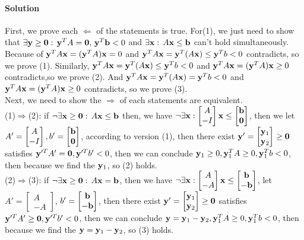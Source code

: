 \documentclass[12pt,a4]{article}
\begin{document}
\paragraph{Solution}
First, we prove each $\Longleftarrow$ of the statements is true. For(1), we just need to show that $ \exists \mathbf{y} \geq \mathbf{0} : \, \mathbf{y}^T A = \mathbf{0}, \,     \mathbf{y}^T \mathbf{b} < 0$ and $\exists \mathbf{x} : \, A \mathbf{x} \leq \mathbf{b}$ can't hold simultaneously. Because of $\mathbf{y}^T A \mathbf{x} = (\mathbf{y}^T A) \mathbf{x} = 0$ and $\mathbf{y}^T A \mathbf{x} = \mathbf{y}^T (A \mathbf{x}) \leq \mathbf{y}^T b < 0$ contradicts, so we prove (1). Similarly, $\mathbf{y}^T A \mathbf{x} = \mathbf{y}^T (A \mathbf{x}) \leq \mathbf{y}^T b < 0$ and $\mathbf{y}^T A \mathbf{x} = (\mathbf{y}^T A) \mathbf{x} \geq 0$ contradicts,so we prove (2). And $\mathbf{y}^T A \mathbf{x} = \mathbf{y}^T (A \mathbf{x}) = \mathbf{y}^T b < 0$ and $\mathbf{y}^T A \mathbf{x} = (\mathbf{y}^T A) \mathbf{x} \geq 0$ contradicts, so we prove (3).\\
Next, we need to show the $\Longrightarrow$ of each statements are equivalent.\\
(1)$\Longrightarrow$(2): if $\neg \exists \mathbf{x} \geq \mathbf{0} : \, A \mathbf{x} \leq \mathbf{b}$ then, we have $\neg \exists \mathbf{x} : \begin{bmatrix} A \\ -I \end{bmatrix} \mathbf{x} \leq \begin{bmatrix} \mathbf{b} \\ \mathbf{0} \end{bmatrix} $, then we let $A' = \begin{bmatrix} A \\ -I \end{bmatrix}, b' = \begin{bmatrix} \mathbf{b} \\ \mathbf{0} \end{bmatrix}$, according to version (1), then there exist $\mathbf{y}' = \begin{bmatrix} \mathbf{y}_1 \\ \mathbf{y}_2 \end{bmatrix} \geq \mathbf{0}$ satisfies $\mathbf{y}'^T A' = \mathbf{0}, \mathbf{y}'^T b' < 0$, then we can conclude $\mathbf{y}_1 \geq 0, \mathbf{y}_1^TA \geq 0, \mathbf{y}_1^T b <0$, then because we find the $\mathbf{y}_1$, so (2) holds.\\
(2)$\Longrightarrow$(3): if $\neg \exists \mathbf{x} \geq \mathbf{0} : \, A \mathbf{x} = \mathbf{b}$, then we have $\neg \exists \mathbf{x} : \begin{bmatrix} A \\ -A \end{bmatrix} \mathbf{x} \leq \begin{bmatrix} \mathbf{b} \\ -\mathbf{b} \end{bmatrix} $, let $A' = \begin{bmatrix} A \\ -A \end{bmatrix}$, $b' = \begin{bmatrix} \mathbf{b} \\ -\mathbf{b} \end{bmatrix}$, then there exist $\mathbf{y}' = \begin{bmatrix} \mathbf{y}_1 \\ \mathbf{y}_2 \end{bmatrix} \geq \mathbf{0}$ satisfies $\mathbf{y}'^T A' \geq \mathbf{0}, \mathbf{y}'^T b' < 0$, then we can conclude $\mathbf{y} =\mathbf{y}_1 - \mathbf{y}_2,  \mathbf{y}_1^TA \geq 0, \mathbf{y}_1^T b <0$, then because we find the $\mathbf{y} = \mathbf{y}_1 - \mathbf{y}_2$, so (3) holds.\\
\end{document}
